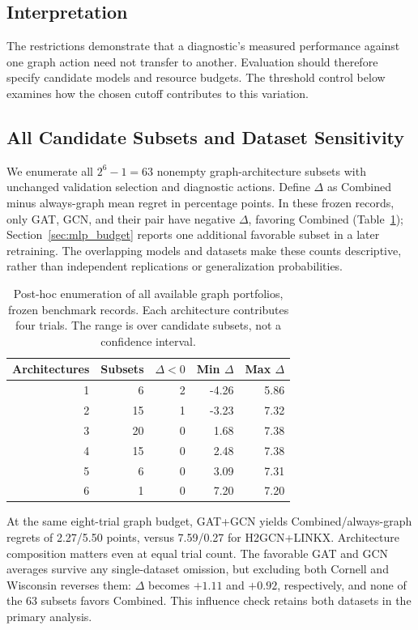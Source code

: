 \subsection{Interpretation}

The restrictions demonstrate that a diagnostic's measured performance against one graph action need not transfer to another. Evaluation should therefore specify candidate models and resource budgets. The threshold control below examines how the chosen cutoff contributes to this variation.

\subsection{All Candidate Subsets and Dataset Sensitivity}
\label{sec:subset_robustness}

We enumerate all $2^6-1=63$ nonempty graph-architecture subsets with unchanged validation selection and diagnostic actions. Define $\Delta$ as Combined minus always-graph mean regret in percentage points. In these frozen records, only GAT, GCN, and their pair have negative $\Delta$, favoring Combined (Table~\ref{tab:subset_sensitivity}); Section~\ref{sec:mlp_budget} reports one additional favorable subset in a later retraining. The overlapping models and datasets make these counts descriptive, rather than independent replications or generalization probabilities.

\begin{table}[t]
\centering
\caption{Post-hoc enumeration of all available graph portfolios, frozen benchmark records. Each architecture contributes four trials. The range is over candidate subsets, not a confidence interval.}
\label{tab:subset_sensitivity}
\small
\setlength{\tabcolsep}{3.5pt}
\begin{tabular}{@{}rrrrr@{}}
\toprule
Architectures & Subsets & $\Delta<0$ & Min $\Delta$ & Max $\Delta$ \\
\midrule
1 & 6 & 2 & -4.26 & 5.86 \\
2 & 15 & 1 & -3.23 & 7.32 \\
3 & 20 & 0 & 1.68 & 7.38 \\
4 & 15 & 0 & 2.48 & 7.38 \\
5 & 6 & 0 & 3.09 & 7.31 \\
6 & 1 & 0 & 7.20 & 7.20 \\
\bottomrule
\end{tabular}
\end{table}

At the same eight-trial graph budget, GAT+GCN yields Combined/always-graph regrets of 2.27/5.50 points, versus 7.59/0.27 for H2GCN+LINKX. Architecture composition matters even at equal trial count. The favorable GAT and GCN averages survive any single-dataset omission, but excluding both Cornell and Wisconsin reverses them: $\Delta$ becomes $+1.11$ and $+0.92$, respectively, and none of the 63 subsets favors Combined. This influence check retains both datasets in the primary analysis.

